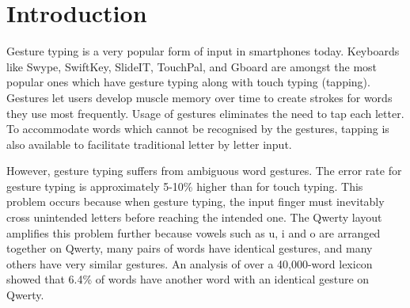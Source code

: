 \documentclass[MTech]{iitmdiss}
\begin{document}




\clearpage




\chapter{Introduction}
\label{chap:intro}


Gesture typing is a very popular form of input in smartphones today. Keyboards like Swype, SwiftKey, SlideIT, TouchPal, and Gboard are amongst the most popular ones which have gesture typing along with touch typing (tapping). Gestures let users develop muscle memory over time to create strokes for words they use most frequently. Usage of gestures eliminates the need to tap each letter. To accommodate words which cannot be recognised by the gestures, tapping is also available to facilitate traditional letter by letter input.




However, gesture typing suffers from ambiguous word gestures. The error rate for gesture typing is approximately 5-10\% \cite{evaluation} higher than for touch typing.  This problem occurs because when gesture typing, the input finger must inevitably cross unintended letters before reaching the intended one. The Qwerty layout amplifies this problem further because vowels such as u, i and o are arranged together on Qwerty, many pairs of words have
identical gestures, and many others have very similar gestures. An analysis of over a 40,000-word lexicon showed that 6.4\% of words have another word with an identical gesture on Qwerty.
\end{document}
